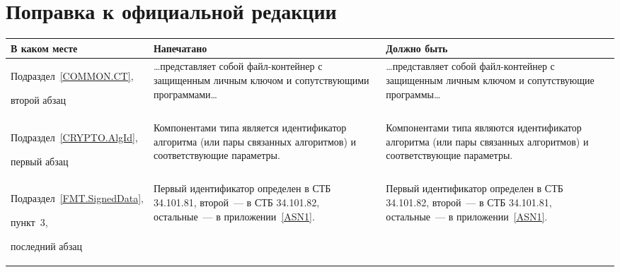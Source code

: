 \clearpage
\chapter*{\mbox{}\hfill Поправка к официальной редакции\hfill\mbox{}}

\mbox{}

\begin{center}
\begin{tabular}{|p{3.5cm}|p{6cm}|p{6cm}|}
\hline
В каком месте & Напечатано & Должно быть\\
\hline
\hline
Подраздел~\ref{COMMON.CT},\par второй абзац
&
\ldots представляет собой файл-контейнер с защищенным личным 
ключом и сопутствующими программами\ldots
&
\ldots представляет собой файл-контейнер с защищенным личным 
ключом и сопутствующие программы\ldots
\\
\hline
Подраздел~\ref{CRYPTO.AlgId},\par первый абзац
&
Компонентами типа является идентификатор алгоритма (или пары 
связанных алгоритмов) и соответствующие параметры. 
&
Компонентами типа являются идентификатор алгоритма (или пары 
связанных алгоритмов) и соответствующие параметры. 
\\
\hline
Подраздел~\ref{FMT.SignedData},\par пункт~3,\par последний абзац 
&
Первый идентификатор определен в СТБ 34.101.81, второй~--- в СТБ 
34.101.82, остальные~--- в приложении~\ref{ASN1}.
&
Первый идентификатор определен в СТБ 34.101.82, второй~--- в СТБ 
34.101.81, остальные~--- в приложении~\ref{ASN1}.
\\
\hline
\end{tabular}
\end{center}